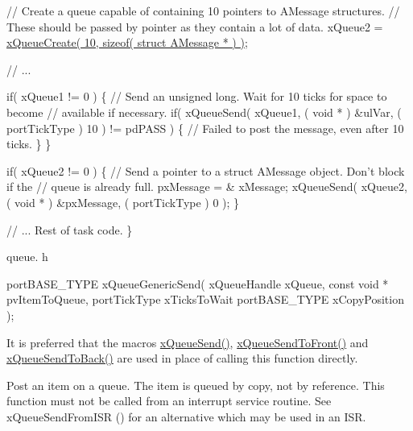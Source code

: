\begin{DoxyPre}   // Create a queue capable of containing 10 pointers to AMessage structures.
   // These should be passed by pointer as they contain a lot of data.
   xQueue2 = \hyperlink{queue_8h_aeb858b824bd74a934ea7ebb81af2a6bb}{xQueueCreate( 10, sizeof( struct AMessage * ) )};\end{DoxyPre}



\begin{DoxyPre}   // ...\end{DoxyPre}



\begin{DoxyPre}   if( xQueue1 != 0 )
   \{
    // Send an unsigned long.  Wait for 10 ticks for space to become
    // available if necessary.
    if( xQueueSend( xQueue1, ( void * ) \&ulVar, ( portTickType ) 10 ) != pdPASS )
    \{
        // Failed to post the message, even after 10 ticks.
    \}
   \}\end{DoxyPre}



\begin{DoxyPre}   if( xQueue2 != 0 )
   \{
    // Send a pointer to a struct AMessage object.  Don't block if the
    // queue is already full.
    pxMessage = \& xMessage;
    xQueueSend( xQueue2, ( void * ) \&pxMessage, ( portTickType ) 0 );
   \}\end{DoxyPre}



\begin{DoxyPre}   // ... Rest of task code.
\}
\end{DoxyPre}


queue. h 
\begin{DoxyPre}
portBASE\_TYPE xQueueGenericSend(
                                xQueueHandle xQueue,
                                const void * pvItemToQueue,
                                portTickType xTicksToWait
                                portBASE\_TYPE xCopyPosition
                            );
  \end{DoxyPre}


It is preferred that the macros \hyperlink{queue_8h_af7eb49d3249351176992950d9185abe9}{x\+Queue\+Send()}, \hyperlink{queue_8h_aa612fcc2b1ceee0200f34b942e300b41}{x\+Queue\+Send\+To\+Front()} and \hyperlink{queue_8h_a81d24a2c1199d58efb76fbee15853112}{x\+Queue\+Send\+To\+Back()} are used in place of calling this function directly.

Post an item on a queue. The item is queued by copy, not by reference. This function must not be called from an interrupt service routine. See x\+Queue\+Send\+From\+I\+SR () for an alternative which may be used in an I\+SR.


